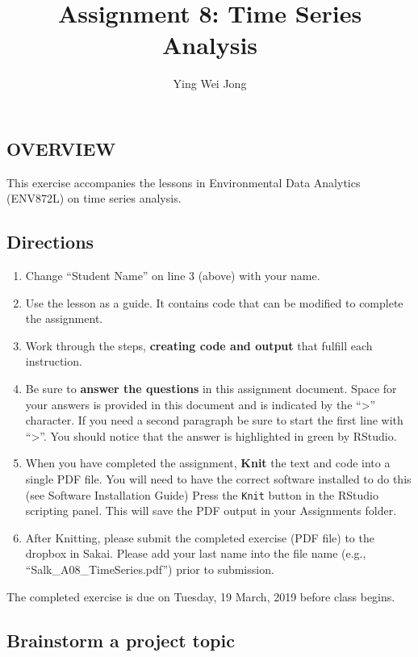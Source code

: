 \documentclass[]{article}
\title{Assignment 8: Time Series Analysis}
\author{Ying Wei Jong}
\date{}
\providecommand{\tightlist}{%
  \setlength{\itemsep}{0pt}\setlength{\parskip}{0pt}}
\begin{document}
\maketitle

\subsection{OVERVIEW}\label{overview}

This exercise accompanies the lessons in Environmental Data Analytics
(ENV872L) on time series analysis.

\subsection{Directions}\label{directions}

\begin{enumerate}
\def\labelenumi{\arabic{enumi}.}
\tightlist
\item
  Change ``Student Name'' on line 3 (above) with your name.
\item
  Use the lesson as a guide. It contains code that can be modified to
  complete the assignment.
\item
  Work through the steps, \textbf{creating code and output} that fulfill
  each instruction.
\item
  Be sure to \textbf{answer the questions} in this assignment document.
  Space for your answers is provided in this document and is indicated
  by the ``\textgreater{}'' character. If you need a second paragraph be
  sure to start the first line with ``\textgreater{}''. You should
  notice that the answer is highlighted in green by RStudio.
\item
  When you have completed the assignment, \textbf{Knit} the text and
  code into a single PDF file. You will need to have the correct
  software installed to do this (see Software Installation Guide) Press
  the \texttt{Knit} button in the RStudio scripting panel. This will
  save the PDF output in your Assignments folder.
\item
  After Knitting, please submit the completed exercise (PDF file) to the
  dropbox in Sakai. Please add your last name into the file name (e.g.,
  ``Salk\_A08\_TimeSeries.pdf'') prior to submission.
\end{enumerate}

The completed exercise is due on Tuesday, 19 March, 2019 before class
begins.

\subsection{Brainstorm a project
topic}\label{brainstorm-a-project-topic}
\end{document}

